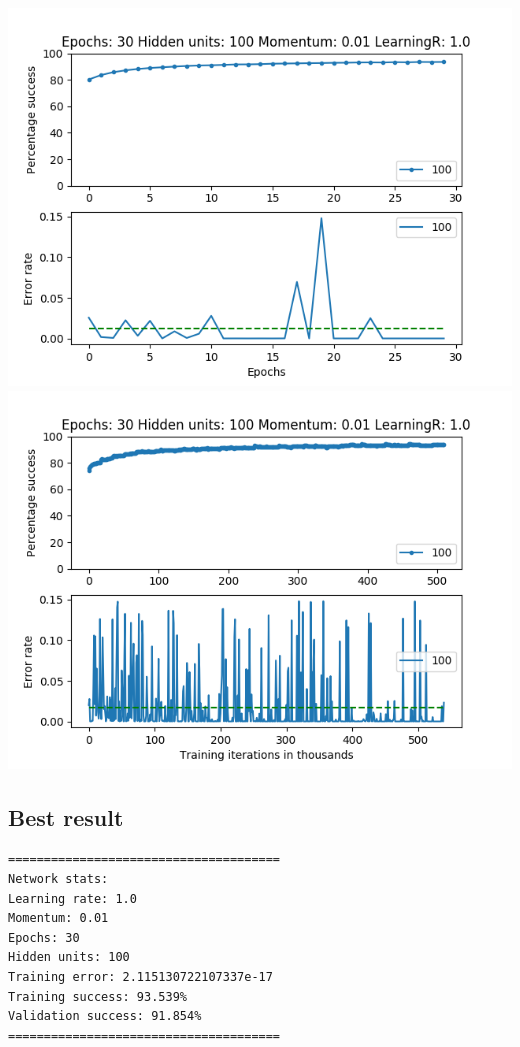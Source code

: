 \documentclass[11pt]{article}
\makeatletter
\def\maxwidth{\ifdim\Gin@nat@width>\linewidth\linewidth
    \else\Gin@nat@width\fi}
\let\Oldincludegraphics\includegraphics
\renewcommand{\includegraphics}[1]{\Oldincludegraphics[width=.8\maxwidth]{#1}}
\makeatother
\begin{document}
\includegraphics{Experiment2/E2_NN_Epoch_Momentum_0.01_30Epochs_100_LR_1.0_Hiddenunits.png}
\includegraphics{Experiment2/E2_NN_Training_Momentum_0.01_30Epochs_100_LR_1.0_Hiddenunits.png}

\hypertarget{best-result}{%
\subsection{Best result}\label{best-result}}

\begin{verbatim}
======================================
Network stats: 
Learning rate: 1.0
Momentum: 0.01
Epochs: 30
Hidden units: 100
Training error: 2.115130722107337e-17
Training success: 93.539%
Validation success: 91.854%
======================================
\end{verbatim}
\end{document}
